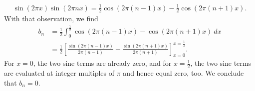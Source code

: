 \documentclass[11pt]{article}
\begin{document}
\begin{solution}
\begin{itemize}
        \begin{align*}
            \sin( 2\pi x) \sin(2\pi n x)
            =
            \frac{1}{2}
            \cos( 2\pi (n-1) x)
            -
            \frac{1}{2}
            \cos( 2\pi (n+1) x)
            .
        \end{align*}
        With that observation, we find 
        \begin{align*}
            b_n 
            &
            =
            \frac{1}{2}
            \int_{0}^{\frac 1 2} 
            \cos( 2\pi (n-1) x)
            -
            \cos( 2\pi (n+1) x)
            \ dx
            \\&
            =
            \frac{1}{2}
            \left[ 
            \frac{ \sin( 2\pi (n-1) x) }{ 2\pi (n-1)}
            -
            \frac{ \sin( 2\pi (n+1) x) }{ 2\pi (n+1)}
            \right]_{x=0}^{x=\frac 1 2}
            .
        \end{align*}
        For $x=0$, the two sine terms are already zero, and for $x=\frac 1 2$, the two sine terms are evaluated at integer multiples of $\pi$ and hence equal zero, too. 
        We conclude that $b_n = 0$. 
        

\end{itemize}
\end{solution}
\end{document}
